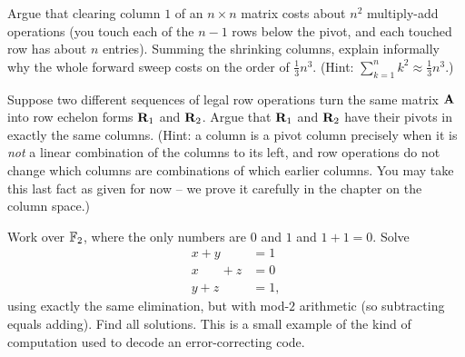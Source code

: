 \begin{exercise}
Argue that clearing column $1$ of an $n\times n$ matrix costs about $n^2$
multiply-add operations (you touch each of the $n-1$ rows below the pivot, and
each touched row has about $n$ entries). Summing the shrinking columns, explain
informally why the whole forward sweep costs on the order of $\tfrac13 n^3$.
(Hint: $\sum_{k=1}^{n} k^2 \approx \tfrac13 n^3$.)
\end{exercise}

\begin{exercise}
Suppose two different sequences of legal row operations turn the same matrix
$\mathbf{A}$ into row echelon forms $\mathbf{R}_1$ and $\mathbf{R}_2$. Argue that
$\mathbf{R}_1$ and $\mathbf{R}_2$ have their pivots in exactly the same columns.
(Hint: a column is a pivot column precisely when it is \emph{not} a linear
combination of the columns to its left, and row operations do not change which
columns are combinations of which earlier columns. You may take this last fact
as given for now -- we prove it carefully in the chapter on the column space.)
\end{exercise}

\begin{exercise}
Work over $\mathbb{F}_2$, where the only numbers are $0$ and $1$ and $1+1=0$.
Solve
\[
\begin{aligned}
x + y \phantom{{}+ z} &= 1\\
x \phantom{{}+ y} + z &= 0\\
y + z &= 1,
\end{aligned}
\]
using exactly the same elimination, but with mod-$2$ arithmetic (so subtracting
equals adding). Find all solutions. This is a small example of the kind of
computation used to decode an error-correcting code.
\end{exercise}
